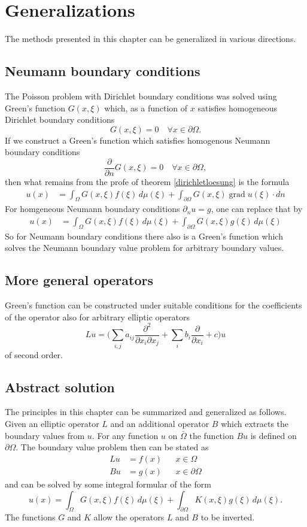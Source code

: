 %
%
%
\section{Generalizations}
The methods presented in this chapter can be generalized in various
directions.

\subsection{Neumann boundary conditions}
The Poisson problem with Dirichlet boundary conditions was solved
using Green's function
$G(x,\xi)$ which, as a function of $x$ satisfies homogeneous
Dirichlet boundary conditions
\[
G(x,\xi)=0\quad\forall x\in\partial\Omega.
\]
If we construct a Green's function which satisfies homogenous 
Neumann boundary conditions
\[
\frac{\partial}{\partial n}G(x,\xi)=0\quad\forall x\in\partial\Omega,
\]
then what remains from the profe of theorem \ref{dirichletloesung}
is the formula
\begin{align*}
u(x)&=\int_{\Omega}G(x,\xi)f(\xi)\,d\mu(\xi)+\int_{\partial\Omega}G(x,\xi)\operatorname{grad}u(\xi)\cdot dn
\end{align*}
For homgeneous Neumann boundary conditions
$\partial_n u=g$, one can replace that by
\begin{align*}
u(x)&=\int_{\Omega}G(x,\xi)f(\xi)\,d\mu(\xi)+\int_{\partial\Omega}G(x,\xi)g(\xi)\,d\mu(\xi)
\end{align*}
So for Neumann boundary conditions there also is a Green's function
which solves the Neumann boundary value problem for arbitrary 
boundary values.

\subsection{More general operators}
Green's function can be constructed under suitable conditions
for the coefficients of the operator also for arbitrary
elliptic operators
\[
Lu=\biggl(\sum_{i,j}a_{ij}\frac{\partial^2}{\partial x_i\partial x_j}
+\sum_ib_i\frac{\partial}{\partial x_i} +c\biggr)u
\]
of second order.

\subsection{Abstract solution}
The principles in this chapter can be summarized and generalized as 
follows.
Given an elliptic operator $L$ and an additional operator $B$ which
extracts the boundary values from $u$.
For any function $u$ on $\bar\Omega$ the function $Bu$ is defined on
$\partial\Omega$.
The boundary value problem then can be stated as 
\begin{align*}
Lu&=f(x)&&x\in\Omega
\\
Bu&=g(x)&&x\in\partial\Omega
\end{align*}
and can be solved by some integral formular of the form
\[
u(x)
=
\int_\Omega G(x,\xi)f(\xi)\,d\mu(\xi)
+
\int_{\partial \Omega}K(x,\xi)g(\xi)\,d\mu(\xi).
\]
The functions $G$ and $K$ allow the operators $L$ and $B$ to be inverted.

